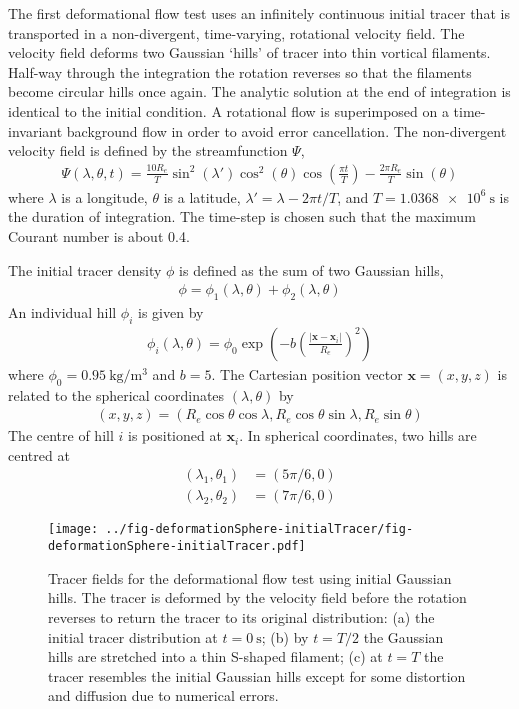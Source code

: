 The first deformational flow test uses an infinitely continuous initial tracer that is transported in a non-divergent, time-varying, rotational velocity field.
The velocity field deforms two Gaussian `hills' of tracer into thin vortical filaments.  Half-way through the integration the rotation reverses so that the filaments become circular hills once again.  The analytic solution at the end of integration is identical to the initial condition.
A rotational flow is superimposed on a time-invariant background flow in order to avoid error cancellation.
The non-divergent velocity field is defined by the streamfunction $\Psi$,
\begin{align}
	\Psi(\lambda, \theta, t) = \frac{10 R_e}{T} \sin^2 \left(\lambda'\right) \cos^2 \left(\theta\right) \cos \left( \frac{\pi t}{T} \right) - \frac{2 \pi R_e}{T} \sin\left(\theta\right)
\end{align}
where $\lambda$ is a longitude, $\theta$ is a latitude, $\lambda' = \lambda - 2 \pi t / T$, and $T = \SI{1.0368e6}{\second}$ is the duration of integration.  The time-step is chosen such that the maximum Courant number is about 0.4.

The initial tracer density $\phi$ is defined as the sum of two Gaussian hills,
\begin{align}
	\phi = \phi_1(\lambda, \theta) + \phi_2(\lambda, \theta)
\end{align}
An individual hill $\phi_i$ is given by
\begin{align}
	\phi_i(\lambda, \theta) = \phi_0 \exp\left( -b \left( \frac{|\mathbf{x} - \mathbf{x}_i|}{R_e} \right)^2 \right)
\end{align}
where $\phi_0 = \SI{0.95}{\kilo\gram\per\meter\cubed}$ and $b = 5$.  The Cartesian position vector $\mathbf{x} = (x,y,z)$ is related to the spherical coordinates $(\lambda, \theta)$ by
\begin{align}
	(x,y,z) = (R_e \cos \theta \cos \lambda, R_e \cos \theta \sin \lambda, R_e \sin \theta) \label{eqn:spherical-cartesian}
\end{align}
The centre of hill $i$ is positioned at $\mathbf{x}_i$.  In spherical coordinates, two hills are centred at
\begin{align}
	(\lambda_1,\theta_1) &= (5 \pi /6, 0) \\
	(\lambda_2,\theta_2) &= (7 \pi /6, 0)
\end{align}

\begin{figure}
	\centering
	\texttt{[image: ../fig-deformationSphere-initialTracer/fig-deformationSphere-initialTracer.pdf]}
	\caption{Tracer fields for the deformational flow test using initial Gaussian hills.  The tracer is deformed by the velocity field before the rotation reverses to return the tracer to its original distribution: (a) the initial tracer distribution at $t = \SI{0}{\second}$; (b) by $t=T/2$ the Gaussian hills are stretched into a thin S-shaped filament; (c) at $t=T$ the tracer resembles the initial Gaussian hills except for some distortion and diffusion due to numerical errors.}
	\label{fig:deformationSphere-evolution}
\end{figure}

